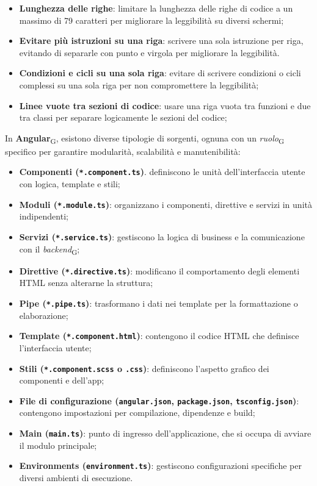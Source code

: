 \begin{itemize}
    \item \textbf{Lunghezza delle righe}: limitare la lunghezza delle righe di codice a un massimo di 79 caratteri per migliorare la leggibilità su diversi schermi;
    \item \textbf{Evitare più istruzioni su una riga}: scrivere una sola istruzione per riga, evitando di separarle con punto e virgola per migliorare la leggibilità.
    \item \textbf{Condizioni e cicli su una sola riga}: evitare di scrivere condizioni o cicli complessi su una sola riga per non compromettere la leggibilità;
    \item \textbf{Linee vuote tra sezioni di codice}: usare una riga vuota tra funzioni e due tra classi per separare logicamente le sezioni del codice;
\end{itemize}

In \textbf{Angular}\textsubscript{G}, esistono diverse tipologie di sorgenti, ognuna con un \textit{ruolo}\textsubscript{G} specifico per garantire modularità, scalabilità e manutenibilità:
\begin{itemize}
    \item \textbf{Componenti (\texttt{*.component.ts})}. definiscono le unità dell’interfaccia utente con logica, template e stili;
    \item \textbf{Moduli (\texttt{*.module.ts})}: organizzano i componenti, direttive e servizi in unità indipendenti;
    \item \textbf{Servizi (\texttt{*.service.ts})}: gestiscono la logica di business e la comunicazione con il \textit{backend}\textsubscript{G};
    \item \textbf{Direttive (\texttt{*.directive.ts})}: modificano il comportamento degli elementi HTML senza alterarne la struttura;
    \item \textbf{Pipe (\texttt{*.pipe.ts})}: trasformano i dati nei template per la formattazione o elaborazione;
    \item \textbf{Template (\texttt{*.component.html})}: contengono il codice HTML che definisce l’interfaccia utente;
    \item \textbf{Stili (\texttt{*.component.scss} o \texttt{.css})}: definiscono l’aspetto grafico dei componenti e dell’app;
    \item \textbf{File di configurazione (\texttt{angular.json}, \texttt{package.json}, \texttt{tsconfig.json})}: contengono impostazioni per compilazione, dipendenze e build;
    \item \textbf{Main (\texttt{main.ts})}: punto di ingresso dell’applicazione, che si occupa di avviare il modulo principale;
    \item \textbf{Environments (\texttt{environment.ts})}: gestiscono configurazioni specifiche per diversi ambienti di esecuzione.  
\end{itemize}

